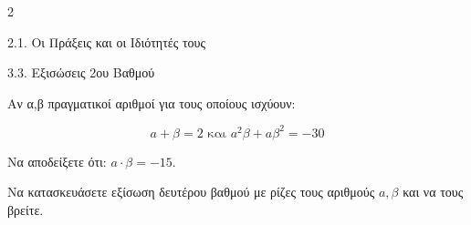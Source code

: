 \begin{ylh}{2}
    \item 2.1. Οι Πράξεις και οι Ιδιότητές τους
    \item 3.3. Εξισώσεις 2ου Βαθμού
\end{ylh}
Αν α,β πραγματικοί αριθμοί για τους οποίους ισχύουν:

\begin{equation*}a + \beta = 2\text{  και  }a^{2}\beta + {a\beta}^{2} = - 30\end{equation*}

\begin{alist}
\item Να αποδείξετε ότι: $a \cdot \beta = - 15.$
\item Να κατασκευάσετε εξίσωση δευτέρου βαθμού με ρίζες τους αριθμούς $a,\beta$ και να τους βρείτε.
\end{alist}

